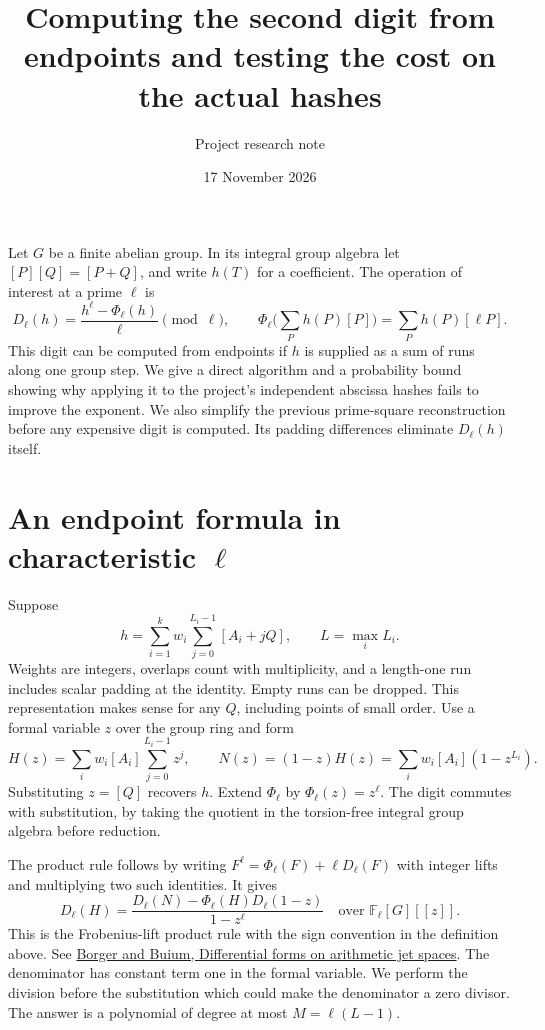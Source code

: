 \documentclass[11pt]{article}
\title{Computing the second digit from endpoints and testing the cost on the actual hashes}
\author{Project research note}
\date{17 November 2026}
\newcommand{\Ph}{\Phi_\ell}
\begin{document}
\maketitle

Let $G$ be a finite abelian group. In its integral group algebra let
$[P][Q]=[P+Q]$, and write $h(T)$ for a coefficient. The operation of
interest at a prime $\ell$ is
\[
   D_\ell(h)=\frac{h^\ell-\Ph(h)}{\ell}\pmod\ell,\qquad
   \Ph\Big(\sum_P h(P)[P]\Big)=\sum_P h(P)[\ell P].
\]
This digit can be computed from endpoints if $h$ is supplied as a
sum of runs along one group step. We give a direct algorithm and a
probability bound showing why applying it to the project's independent
abscissa hashes fails to improve the exponent. We also simplify the
previous prime-square reconstruction before any expensive digit is
computed. Its padding differences eliminate $D_\ell(h)$ itself.

\section{An endpoint formula in characteristic \(\ell\)}
Suppose
\[
 h=\sum_{i=1}^k w_i\sum_{j=0}^{L_i-1}[A_i+jQ],\qquad
 L=\max_i L_i .
\]
Weights are integers, overlaps count with multiplicity, and a length-one
run includes scalar padding at the identity. Empty runs can be dropped.
This representation makes sense for any $Q$, including points of small
order. Use a formal variable $z$ over the group ring and form
\[
 H(z)=\sum_i w_i[A_i]\sum_{j=0}^{L_i-1}z^j,\qquad
 N(z)=(1-z)H(z)=\sum_i w_i[A_i](1-z^{L_i}).
\]
Substituting $z=[Q]$ recovers $h$. Extend $\Ph$ by $\Ph(z)=z^\ell$.
The digit commutes with substitution, by taking the quotient in the
torsion-free integral group algebra before reduction.

The product rule follows by writing $F^\ell=\Ph(F)+\ell D_\ell(F)$
with integer lifts and multiplying two such identities. It gives
\[
 D_\ell(H)=
 \frac{D_\ell(N)-\Ph(H)D_\ell(1-z)}{1-z^\ell}
                  \quad\text{over }\mathbb F_\ell[G][[z]] .
\]
This is the Frobenius-lift product rule with the sign convention in
the definition above. See
\href{https://maths-people.anu.edu.au/~borger/papers/07/forms.pdf}
{Borger and Buium, Differential forms on arithmetic jet spaces}.
The denominator has constant term one in the formal variable. We
perform the division before the substitution which could make the
denominator a zero divisor. The answer is a polynomial of degree at
most $M=\ell(L-1)$.
\end{document}
